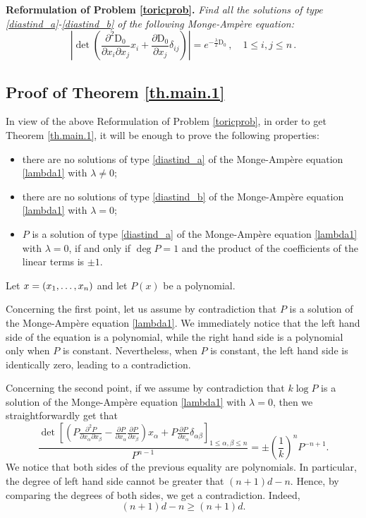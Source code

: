\documentclass[11pt, reqno]{amsart}
\newcommand{\de}{\partial}
\newcommand{\dd}{\mathrm{D}}
\begin{document}
\medskip\noindent
\textbf{\large Reformulation of Problem \ref{toricprob}.}
\emph{Find all the solutions of type \eqref{diastind_a}-\eqref{diastind_b} of the following Monge-Ampère equation:}
\begin{equation}\label{lambda1}
\left|\det\left( \frac{\de^2 \dd_0}{\de x_i\de x_j}x_i+\frac{\de \dd_0}{\de x_j}\delta_{ij}\right)\right|=
 e^{-\frac{\lambda}{2}\dd_0}\,, \quad 1\leq i,j\leq n\,.
\end{equation}




\medskip

\subsection{Proof of Theorem \ref{th.main.1}}\label{sec.th.1}

In view of the above Reformulation of Problem \ref{toricprob}, in order to get Theorem \ref{th.main.1}, it will be enough to prove the following properties:
\begin{itemize}
\item there are no solutions of type \eqref{diastind_a} of the Monge-Ampère equation \eqref{lambda1} with $\lambda\neq 0$;
\item there are no solutions of type \eqref{diastind_b} of the Monge-Ampère equation \eqref{lambda1} with $\lambda=0$;
\item  $P$ is a solution of type \eqref{diastind_a} of the Monge-Ampère equation \eqref{lambda1} with $\lambda=0$,  if and only if $\deg P=1$ and the product of the coefficients of the linear terms is $\pm 1$.
\end{itemize}

Let $x=(x_1,\mathellipsis,x_n)$ and let $P(x)$ be a polynomial. 

\smallskip
Concerning the first point, let us assume by contradiction that $ P$ is a solution of the Monge-Ampère equation \eqref{lambda1}. We immediately notice that the left hand side of the equation is a polynomial, while the right hand side is a polynomial only when $P$ is constant. Nevertheless, when $P$ is constant, the left hand side is identically zero, leading to  a contradiction.

\smallskip
Concerning the second point, if we assume by contradiction that $k \log P$ is a solution of the Monge-Ampère equation  \eqref{lambda1} with $\lambda= 0$, then we straightforwardly get that
$$\frac{\det\left[\left(P \frac{\partial^2 P}{\partial{x_\alpha}\partial{x_\beta}}-\frac{\partial P}{\partial{x_\alpha}}\frac{\partial P}{\partial{x_\beta}}\right)x_\alpha+P\frac{\partial P}{\partial{x_\alpha}} \delta_{\alpha\beta}\right]_{1\leq\alpha,\beta\leq n}}{P^{n-1}}=\pm\left(\frac{1}{k} \right)^n P^{-n+1}.$$
We notice that both sides of the  previous equality are polynomials. In particular, the degree of left hand side  cannot be greater that $(n+1)d-n$. Hence, by comparing the degrees of both sides, we get a contradiction. Indeed,
$$(n+1)d-n \geq (n+1)d.$$
\end{document}
